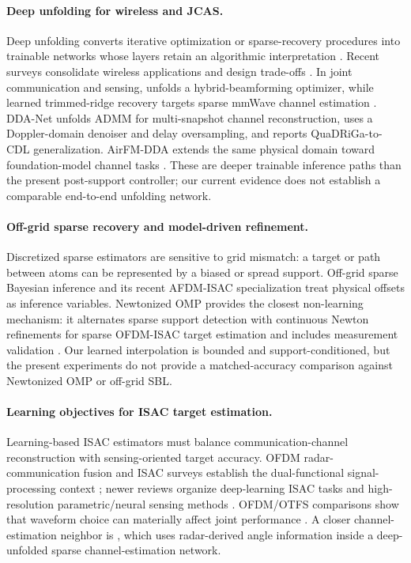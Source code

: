 \paragraph{Deep unfolding for wireless and JCAS.}
Deep unfolding converts iterative optimization or sparse-recovery procedures into trainable networks whose layers retain an algorithmic interpretation \cite{monga2021algorithm_unrolling,shlezinger2023model_based_deep_learning}. Recent surveys consolidate wireless applications and design trade-offs \cite{deka2025deep_unfolding_review,shlezinger2025deep_unfolding_guidelines}. In joint communication and sensing, \cite{nguyen2024jcas_deep_unfolding_hbf} unfolds a hybrid-beamforming optimizer, while learned trimmed-ridge recovery targets sparse mmWave channel estimation \cite{wu2024learned_trimmed_ridge}. DDA-Net \cite{ma2026ddanet} unfolds ADMM for multi-snapshot channel reconstruction, uses a Doppler-domain denoiser and delay oversampling, and reports QuaDRiGa-to-CDL generalization. AirFM-DDA extends the same physical domain toward foundation-model channel tasks \cite{bian2026airfm_dda}. These are deeper trainable inference paths than the present post-support controller; our current evidence does not establish a comparable end-to-end unfolding network.

\paragraph{Off-grid sparse recovery and model-driven refinement.}
Discretized sparse estimators are sensitive to grid mismatch: a target or path between atoms can be represented by a biased or spread support. Off-grid sparse Bayesian inference \cite{yang2013ogsbi} and its recent AFDM-ISAC specialization \cite{luo2025offgrid_sbl_afdm} treat physical offsets as inference variables. Newtonized OMP provides the closest non-learning mechanism: it alternates sparse support detection with continuous Newton refinements for sparse OFDM-ISAC target estimation and includes measurement validation \cite{shah2024nomp_isac}. Our learned interpolation is bounded and support-conditioned, but the present experiments do not provide a matched-accuracy comparison against Newtonized OMP or off-grid SBL.

\paragraph{Learning objectives for ISAC target estimation.}
Learning-based ISAC estimators must balance communication-channel reconstruction with sensing-oriented target accuracy. OFDM radar-communication fusion and ISAC surveys establish the dual-functional signal-processing context \cite{sturm2011waveform,liu2022isac}; newer reviews organize deep-learning ISAC tasks and high-resolution parametric/neural sensing methods \cite{temiz2025deep_learning_isac_survey,naoumi2025high_resolution_isac,vaezi2025ai_empowered_isac_tutorial}. OFDM/OTFS comparisons show that waveform choice can materially affect joint performance \cite{gaudio2019ofdm_otfs}. A closer channel-estimation neighbor is \cite{yang2026radar_cenet}, which uses radar-derived angle information inside a deep-unfolded sparse channel-estimation network.

